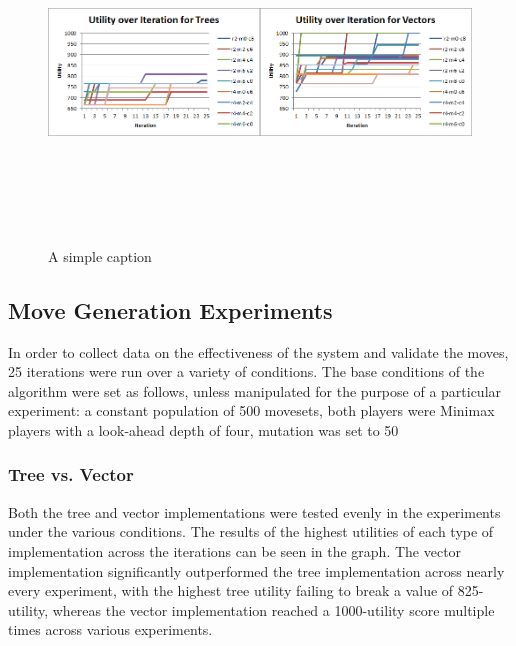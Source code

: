 \documentclass{acm_proc_article-sp}
\begin{document}
\begin{figure}[ht!]
\centering
\includegraphics[width=\textwidth,height=90mm,keepaspectratio]{./images/gen-mureco-comparison.png}
\caption{A simple caption}
\label{utility_experiments}
\end{figure}
    
    \subsection{Move Generation Experiments}

In order to collect data on the effectiveness of the system and validate the moves, 25 iterations were run over a variety of conditions. The base conditions of the algorithm were set as follows, unless manipulated for the purpose of a particular experiment: a constant population of 500 movesets, both players were Minimax players with a look-ahead depth of four, mutation was set to 50%

    \subsubsection{Tree vs. Vector}

Both the tree and vector implementations were tested evenly in the experiments under the various conditions. The results of the highest utilities of each type of implementation across the iterations can be seen in the graph. The vector implementation significantly outperformed the tree implementation across nearly every experiment, with the highest tree utility failing to break a value of 825-utility, whereas the vector implementation reached a 1000-utility score multiple times across various experiments. 
\end{document}
